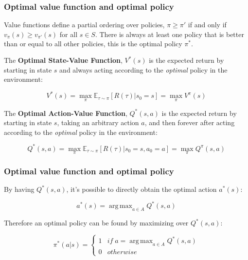 \documentclass[10pt]{beamer}
\newcommand{\E}{{\mathbb E}}
\DeclareMathOperator*{\argmax}{arg\,max}
\begin{document}
\begin{frame}
	\frametitle{Optimal value function and optimal policy }
	Value functions define a partial ordering over policies,
	$\pi \geq \pi'$ if and only if $v_\pi(s) \geq v_{\pi'}(s)$ for all $s \in S$. There is always at least one policy that is better than or equal to all other policies, this is the optimal policy $\pi^*$.

	\begin{definition}
		The \textbf{Optimal State-Value Function}, $V^*(s)$ is the expected return by starting in state $s$ and always acting according to the \textit{optimal} policy in the environment:
		
		\begin{equation}
			V^{*}(s) = \max_\pi \E_{\tau \sim \pi} [R(\tau)| s_0 = s] = \max_\pi V^\pi(s)
		\end{equation}
	\end{definition}

	\begin{definition}
		The \textbf{Optimal Action-Value Function}, $Q^*(s,a)$ is the expected return by starting in state $s$, taking an arbitrary action $a$, and then forever after acting according to the \textit{optimal} policy in the environment:
		
		\begin{equation}
		Q^*(s,a) = \max_{\pi} \E_{\tau \sim \pi}{[R(\tau)| s_0 = s, a_0 = a]} = \max_\pi Q^\pi(s,a)
		\end{equation}
	\end{definition}

\end{frame}


\begin{frame}
	\frametitle{Optimal value function and optimal policy }
	By having $Q^*(s,a)$, it's possible to directly obtain the optimal action $a^*(s)$:

	\begin{equation}
		a^*(s) = \argmax_{a \in A} Q^* (s,a)
	\end{equation}

	Therefore an optimal policy can be found by maximizing over $Q^*(s,a)$:

	\begin{equation}
		\pi^*(a|s) = 
		\begin{cases}
			1 & if \; a = \argmax_{a \in A} Q^*(s,a)\\
			0 & otherwise
		\end{cases}
		\label{eq:opt-policy}
	\end{equation}

\end{frame}
\end{document}
